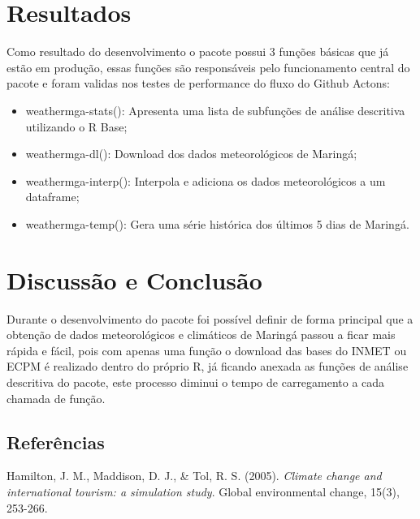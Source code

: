 \documentclass[final]{beamer}
\begin{document}
\begin{frame}[t]
\begin{multicols}{2}
\section{Resultados}

Como resultado do desenvolvimento o pacote possui 3 funções básicas que já estão em produção, essas funções são responsáveis pelo funcionamento central do pacote e foram validas nos testes de performance do fluxo do  Github Actons:
\begin{itemize}
  \item weathermga-stats(): Apresenta uma lista de subfunções de análise descritiva utilizando o R Base;
  \item weathermga-dl(): Download dos dados meteorológicos de Maringá;
  \item weathermga-interp(): Interpola e adiciona os dados meteorológicos a um dataframe;
  \item weathermga-temp(): Gera uma série histórica dos últimos 5 dias de Maringá.
\end{itemize}


\section{Discussão e Conclusão}

Durante o desenvolvimento do pacote foi possível definir de forma principal que a obtenção de dados meteorológicos e climáticos de Maringá passou a ficar mais rápida e fácil, pois com apenas uma função o download das bases do INMET ou ECPM é realizado dentro do próprio R, já ficando anexada as funções de análise descritiva do pacote, este processo diminui o tempo de carregamento a cada chamada de função.




\subsection{Referências}

\begin{thebibliography}{99}

 Hamilton, J. M., Maddison, D. J., & Tol, R. S. (2005). \textit{Climate change and international tourism: a simulation study}. Global environmental change, 15(3), 253-266.


\end{thebibliography}
\end{multicols}
\end{frame}
\end{document}
